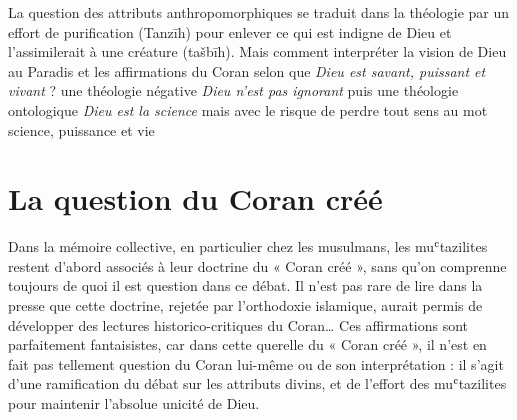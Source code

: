 \begin{Synthesis}
La question des attributs anthropomorphiques se traduit dans la théologie \mzt par un effort de purification (Tanzīh) pour enlever ce qui est indigne de Dieu et l'assimilerait à une créature (tašbīh). Mais comment interpréter la vision de Dieu au Paradis et les affirmations du Coran selon que \textit{Dieu est savant, puissant et vivant} ?   une théologie négative \textit{Dieu n'est pas ignorant} puis une théologie ontologique \textit{Dieu est la science} mais avec le risque de perdre tout sens au mot science, puissance et vie
\end{Synthesis}
\hypertarget{la-question-du-coran-cruxe9uxe9}{%
\section{La question du Coran
créé}\label{la-question-du-coran-cruxe9uxe9}}

Dans la mémoire collective, en particulier chez les musulmans, les
muʿtazilites restent d'abord associés à leur doctrine du « Coran créé »,
sans qu'on comprenne toujours de quoi il est question dans ce débat. Il
n'est pas rare de lire dans la presse que cette doctrine, rejetée par
l'orthodoxie islamique, aurait permis de développer des lectures
historico-critiques du Coran\ldots{} Ces affirmations sont parfaitement
fantaisistes, car dans cette querelle du « Coran créé », il n'est en
fait pas tellement question du Coran lui-même ou de son interprétation :
il s'agit d'une ramification du débat sur les attributs divins, et de
l'effort des muʿtazilites pour maintenir l'absolue unicité de Dieu.

